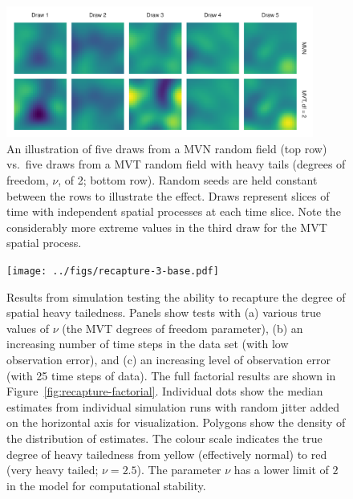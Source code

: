 \documentclass[12pt,english]{article}
\begin{document}
\begin{spacing}{1.25}
\clearpage

\begin{figure}[htb]
\begin{center}
  \includegraphics[width=0.9\textwidth]{../figs/nu-rf-illustration.pdf}
\caption{An illustration of five draws from a MVN random field (top row)
vs.\ five draws from a MVT random field with heavy tails
(degrees of freedom, $\nu$, of 2; bottom row). Random seeds are held constant
between the rows
to illustrate the effect. Draws represent slices of time with independent spatial
processes at each time slice. Note the considerably more extreme values in
the third draw for the MVT spatial process.}
\label{fig:nu}
\end{center}
\end{figure}

\clearpage

\begin{figure}[htb]
\begin{center}
  \texttt{[image: ../figs/recapture-3-base.pdf]}
\caption{Results from simulation testing the ability to recapture the degree
of spatial heavy tailedness. Panels show
tests with (a) various true values of $\nu$ (the MVT degrees of freedom parameter),
(b) an increasing number of time steps in the data set (with low observation error),
and (c) an increasing level of observation error (with 25 time steps of data).
The full factorial results are shown in Figure~\ref{fig:recapture-factorial}.
Individual dots show the median estimates from individual simulation runs
with random jitter added on the horizontal axis for visualization.
Polygons show the density of the distribution of estimates.
The colour scale indicates the true degree of heavy tailedness from
yellow (effectively normal) to red (very heavy tailed; $\nu = 2.5$).
The parameter $\nu$ has a lower limit of $2$ in the model
for computational stability.
}
\label{fig:recapture}
\end{center}
\end{figure}


\end{spacing}
\end{document}
